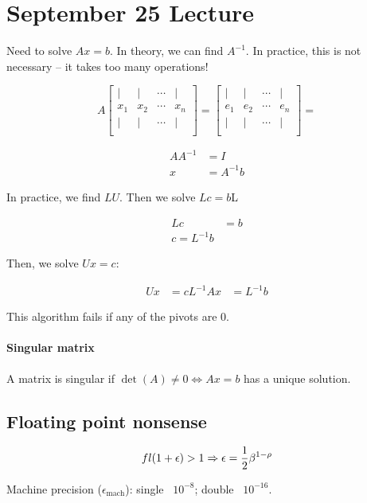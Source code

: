 \section{September 25 Lecture}
Need to solve $Ax=b$. In theory, we can find $A^{-1}$. In practice, this is not necessary -- it takes too many operations!

\[
  A \begin{bmatrix}
    | & | & \cdots & |  \\
    x_1 & x_2 & \cdots & x_n  \\
    | & | & \cdots & |  \\
  \end{bmatrix} = 
  \begin{bmatrix}
    | & | & \cdots & |  \\
    e_1 & e_2 & \cdots & e_n  \\
    | & | & \cdots & |  \\
  \end{bmatrix} = 
\]

\begin{align*}
  A A^{-1} &= I \\
  x &= A^{-1}b
\end{align*}

In practice, we find $LU$. Then we solve $Lc = b$L

\begin{align*}
  Lc &= b \\
  c = L^{-1}b
\end{align*}

Then, we solve $Ux = c$:

\begin{align*}
  Ux &= c
  L^{-1} A x &= L^{-1} b
\end{align*}

This algorithm fails if any of the pivots are 0.

\paragraph{Singular matrix} A matrix is singular if $\det(A) \not= 0 \iff Ax = b$ has a unique solution.

\subsection{Floating point nonsense}

\[
  fl(1 + \epsilon) > 1 \Rightarrow \epsilon = {1 \over 2} \beta^{1 - \rho}
\]

Machine precision ($\epsilon_{\text{mach}}$): single ~$10^{-8}$; double ~$10^{-16}$.


